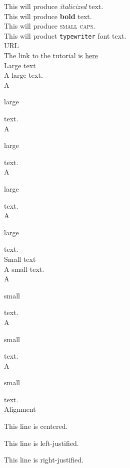 \documentclass[11pt]{article}
\begin{document}
This will produce \textit{italicized} text.\\
This will produce \textbf{bold} text.\\
This will produce \textsc{small caps}.\\
This will product \texttt{typewriter} font text.\\
URL\\
The link to the tutorial is \href{https://www.youtube.com/watch?v=ydOTMQC7np0}{here}\\
Large text\\
A large text.\\
A \begin{large}large\end{large} text.\\
A \begin{Large}large\end{Large} text.\\
A \begin{huge}large\end{huge} text.\\
A \begin{Huge}large\end{Huge}text.\\
Small text\\
A small text.\\
A \begin{small}small\end{small} text.\\
A \begin{scriptsize}small\end{scriptsize} text.\\
A \begin{tiny}small\end{tiny} text.\\
Alignment\\
\begin{center}
This line is centered.
\end{center}
\begin{flushleft}
This line is left-justified.
\end{flushleft}
\begin{flushright}
This line is right-justified.
\end{flushright}
\end{document}
